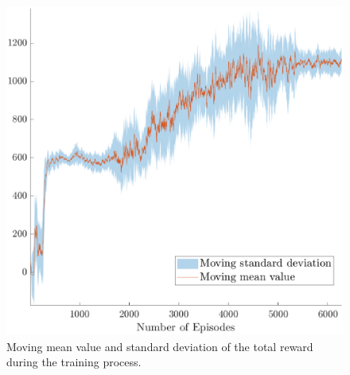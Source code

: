 \begin{figure}
	\centering
	\includegraphics[scale=0.75]{figure/Part2/Chapter5/Images/std_plot.eps} 
	\caption{Moving mean value and standard deviation of the total reward during the training process.}
	\label{fig:training_result}
\end{figure}



